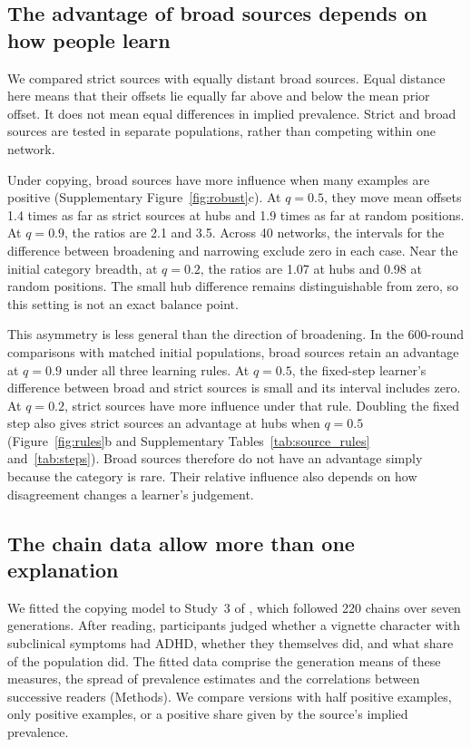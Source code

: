 \documentclass[11pt]{article}
\begin{document}
\subsection{The advantage of broad sources depends on how people learn}

We compared strict sources with equally distant broad sources. Equal distance here means that their offsets lie equally far above and below the mean prior offset. It does not mean equal differences in implied prevalence. Strict and broad sources are tested in separate populations, rather than competing within one network.

Under copying, broad sources have more influence when many examples are positive (Supplementary Figure~\ref{fig:robust}c). At $q=0.5$, they move mean offsets 1.4 times as far as strict sources at hubs and 1.9 times as far at random positions. At $q=0.9$, the ratios are 2.1 and 3.5. Across 40 networks, the intervals for the difference between broadening and narrowing exclude zero in each case. Near the initial category breadth, at $q=0.2$, the ratios are 1.07 at hubs and 0.98 at random positions. The small hub difference remains distinguishable from zero, so this setting is not an exact balance point.

This asymmetry is less general than the direction of broadening. In the 600-round comparisons with matched initial populations, broad sources retain an advantage at $q=0.9$ under all three learning rules. At $q=0.5$, the fixed-step learner's difference between broad and strict sources is small and its interval includes zero. At $q=0.2$, strict sources have more influence under that rule. Doubling the fixed step also gives strict sources an advantage at hubs when $q=0.5$ (Figure~\ref{fig:rules}b and Supplementary Tables~\ref{tab:source_rules} and~\ref{tab:steps}). Broad sources therefore do not have an advantage simply because the category is rare. Their relative influence also depends on how disagreement changes a learner's judgement.

\subsection{The chain data allow more than one explanation}
\label{sec:chain}

We fitted the copying model to Study~3 of \citet{katiyar2026}, which followed 220 chains over seven generations. After reading, participants judged whether a vignette character with subclinical symptoms had ADHD, whether they themselves did, and what share of the population did. The fitted data comprise the generation means of these measures, the spread of prevalence estimates and the correlations between successive readers (Methods). We compare versions with half positive examples, only positive examples, or a positive share given by the source's implied prevalence.
\end{document}
